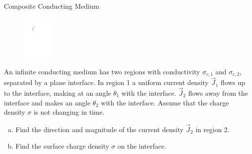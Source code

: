 \documentclass{esg8022pset}
\begin{document}
\begin{problem}{Composite Conducting Medium}
  \begin{figure}\vspace{-5\intextsep}
    \begin{center}\includegraphics[width=0.15\textwidth]{ps06_07_01}\end{center}
  \end{figure}
  An infinite conducting medium has two regions with conductivity $\sigma_{c,1}$ and $\sigma_{c,2}$, separated by a plane interface. In
  region 1 a uniform current density $\vec J_1$ flows up to the interface, making at an angle $\theta_1$ with the interface. $\vec J_2$ flows away from the interface and makes an angle $\theta_2$ with the interface. Assume that the charge density $\sigma$ is not changing in time.
  \begin{enumerate}[(a)]
    \item Find the direction and magnitude of the current density $\vec J_2$ in region 2.
    \item Find the surface charge density $\sigma$ on the interface.
  \end{enumerate}
\end{problem}
\end{document}

